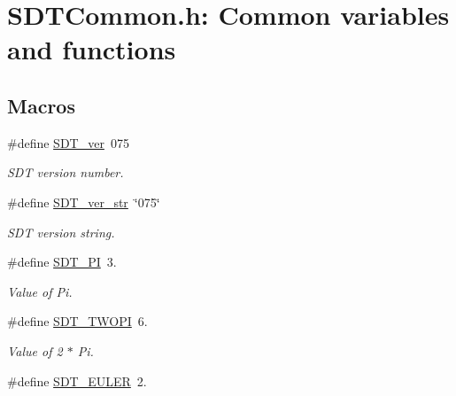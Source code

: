 \hypertarget{group__common}{}\section{S\+D\+T\+Common.\+h\+: Common variables and functions}
\label{group__common}
\subsection*{Macros}
\begin{DoxyCompactItemize}
\item 
\hypertarget{group__common_gab6e61b5e260d784833e230a33efc6a48}{}\#define \hyperlink{group__common_gab6e61b5e260d784833e230a33efc6a48}{S\+D\+T\+\_\+ver}~075\label{group__common_gab6e61b5e260d784833e230a33efc6a48}

\begin{DoxyCompactList}\small\item\em S\+D\+T version number. \end{DoxyCompactList}\item 
\hypertarget{group__common_gaf8d98d86bcb77f3f61403b29483527d5}{}\#define \hyperlink{group__common_gaf8d98d86bcb77f3f61403b29483527d5}{S\+D\+T\+\_\+ver\+\_\+str}~\char`\"{}075\char`\"{}\label{group__common_gaf8d98d86bcb77f3f61403b29483527d5}

\begin{DoxyCompactList}\small\item\em S\+D\+T version string. \end{DoxyCompactList}\item 
\hypertarget{group__common_ga292e893120950fc4c58e10d6a56beeb9}{}\#define \hyperlink{group__common_ga292e893120950fc4c58e10d6a56beeb9}{S\+D\+T\+\_\+\+P\+I}~3.\label{group__common_ga292e893120950fc4c58e10d6a56beeb9}

\begin{DoxyCompactList}\small\item\em Value of Pi. \end{DoxyCompactList}\item 
\hypertarget{group__common_gac8193381f9a9cbb3203c93e0f1cd2502}{}\#define \hyperlink{group__common_gac8193381f9a9cbb3203c93e0f1cd2502}{S\+D\+T\+\_\+\+T\+W\+O\+P\+I}~6.\label{group__common_gac8193381f9a9cbb3203c93e0f1cd2502}

\begin{DoxyCompactList}\small\item\em Value of 2 $\ast$ Pi. \end{DoxyCompactList}\item 
\hypertarget{group__common_ga70e01d4fd1e52279bd5b66f3130551a2}{}\#define \hyperlink{group__common_ga70e01d4fd1e52279bd5b66f3130551a2}{S\+D\+T\+\_\+\+E\+U\+L\+E\+R}~2.\label{group__common_ga70e01d4fd1e52279bd5b66f3130551a2}


\end{DoxyCompactItemize}
